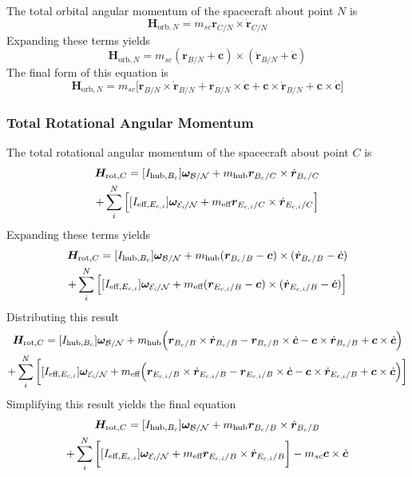 The total orbital angular momentum of the spacecraft about point $N$ is
\begin{equation}
\bm H_{\text{orb},N} = m_{sc} \bm r_{C/N} \times \dot{\bm r}_{C/N}
\end{equation}
Expanding these terms yields
\begin{equation}
\bm H_{\text{orb},N} = m_{sc} (\bm r_{B/N} + \bm c) \times (\dot{\bm r}_{B/N} + \dot{\bm c})
\end{equation}
The final form of this equation is
\begin{equation}
\bm H_{\text{orb},N} = m_{sc} \Big[\bm r_{B/N} \times \dot{\bm r}_{B/N} + \bm r_{B/N} \times \dot{\bm c} + \bm c \times \dot{\bm r}_{B/N} + \bm c \times \dot{\bm c}\Big]
\end{equation}

\subsubsection{Total Rotational Angular Momentum}

The total rotational angular momentum of the spacecraft about point $C$ is
\begin{multline}
\bm H_{\text{rot},C} = [I_{\text{hub},B_c}] \bm \omega_{\cal{B/N}} + m_{\text{hub}} \bm r_{B_c/C}\times \dot{\bm r}_{B_c/C}\\
+ \sum\limits_{i}^{N}\Big[[I_{\text{eff},E_{c,i}}] \bm \omega_{\cal{E}_{\textit{i}}/\cal{N}}
+ m_{\text{eff}} \bm r_{E_{c,i}/C} \times \dot{\bm r}_{E_{c,i}/C} \Big]
\end{multline}
Expanding these terms yields
\begin{multline}
\bm H_{\text{rot},C} = [I_{\text{hub},B_c}] \bm \omega_{\cal{B/N}} + m_{\text{hub}} (\bm r_{B_c/B} - \bm c)\times (\dot{\bm r}_{B_c/B} - \dot{\bm c})\\
+ \sum\limits_{i}^{N}\Big[[I_{\text{eff},E_{c,i}}] \bm \omega_{\cal{E}_{\textit{i}}/\cal{N}}
+ m_{\text{eff}} (\bm r_{E_{c,i}/B} - \bm c) \times (\dot{\bm r}_{E_{c,i}/B} - \dot{\bm c}) \Big]
\end{multline}
Distributing this result
\begin{multline}
\bm H_{\text{rot},C} = [I_{\text{hub},B_c}] \bm \omega_{\cal{B/N}} + m_{\text{hub}} \Big(\bm r_{B_c/B} \times \dot{\bm r}_{B_c/B} - \bm r_{B_c/B} \times \dot{\bm c} - \bm c \times \dot{\bm r}_{B_c/B} + \bm c \times \dot{\bm c}\Big)\\
+ \sum\limits_{i}^{N}\bigg[[I_{\text{eff},E_{c,i}}] \bm \omega_{\cal{E}_{\textit{i}}/\cal{N}}
+ m_{\text{eff}} \Big(\bm r_{E_{c,i}/B} \times \dot{\bm r}_{E_{c,i}/B} - \bm r_{E_{c,i}/B} \times \dot{\bm c} - \bm c \times \dot{\bm r}_{E_{c,i}/B} + \bm c \times \dot{\bm c}\Big) \bigg]
\end{multline}
Simplifying this result yields the final equation
\begin{multline}
\bm H_{\text{rot},C} = [I_{\text{hub},B_c}] \bm \omega_{\cal{B/N}} + m_{\text{hub}} \bm r_{B_c/B} \times \dot{\bm r}_{B_c/B}\\
+ \sum\limits_{i}^{N}\bigg[[I_{\text{eff},E_{c,i}}] \bm \omega_{\cal{E}_{\textit{i}}/\cal{N}}
+ m_{\text{eff}} \bm r_{E_{c,i}/B} \times \dot{\bm r}_{E_{c,i}/B} \bigg] - m_{sc} \bm c \times \dot{\bm c}
\end{multline}

